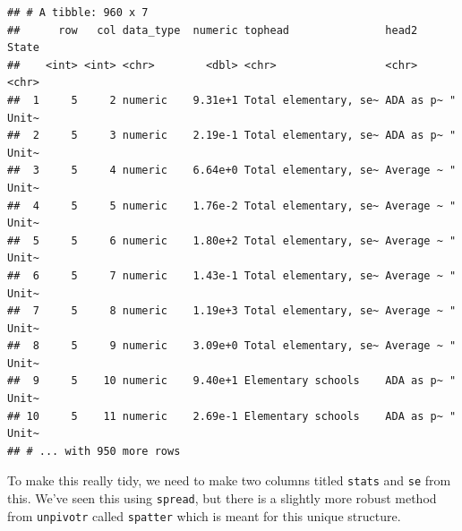 \documentclass[12pt,letterpaperpaper,openany]{book}
\newenvironment{Shaded}{\begin{snugshade}}{\end{snugshade}}
\newcommand{\KeywordTok}[1]{\textcolor[rgb]{0.13,0.29,0.53}{\textbf{#1}}}
\newcommand{\NormalTok}[1]{#1}
\newcommand{\OperatorTok}[1]{\textcolor[rgb]{0.81,0.36,0.00}{\textbf{#1}}}
\newcommand{\StringTok}[1]{\textcolor[rgb]{0.31,0.60,0.02}{#1}}
\begin{document}
\begin{Shaded}
\end{Shaded}

\begin{verbatim}
## # A tibble: 960 x 7
##      row   col data_type  numeric tophead               head2     State    
##    <int> <int> <chr>        <dbl> <chr>                 <chr>     <chr>    
##  1     5     2 numeric    9.31e+1 Total elementary, se~ ADA as p~ "   Unit~
##  2     5     3 numeric    2.19e-1 Total elementary, se~ ADA as p~ "   Unit~
##  3     5     4 numeric    6.64e+0 Total elementary, se~ Average ~ "   Unit~
##  4     5     5 numeric    1.76e-2 Total elementary, se~ Average ~ "   Unit~
##  5     5     6 numeric    1.80e+2 Total elementary, se~ Average ~ "   Unit~
##  6     5     7 numeric    1.43e-1 Total elementary, se~ Average ~ "   Unit~
##  7     5     8 numeric    1.19e+3 Total elementary, se~ Average ~ "   Unit~
##  8     5     9 numeric    3.09e+0 Total elementary, se~ Average ~ "   Unit~
##  9     5    10 numeric    9.40e+1 Elementary schools    ADA as p~ "   Unit~
## 10     5    11 numeric    2.69e-1 Elementary schools    ADA as p~ "   Unit~
## # ... with 950 more rows
\end{verbatim}

To make this really tidy, we need to make two columns titled \texttt{stats} and \texttt{se} from this.
We've seen this using \texttt{spread}, but there is a slightly more robust method from \texttt{unpivotr} called
\texttt{spatter} which is meant for this unique structure.
\end{document}
